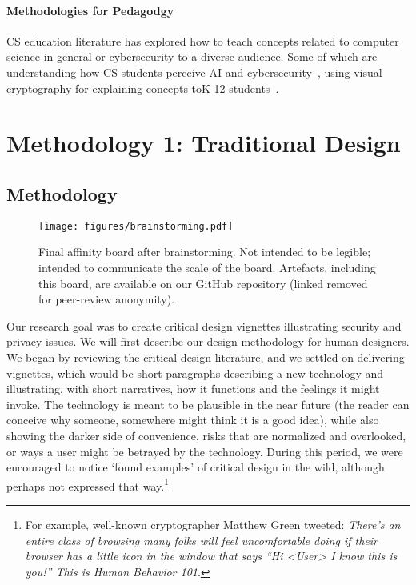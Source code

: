 \paragraph{Methodologies for Pedagodgy} 
CS education literature has explored how to teach concepts related to computer science in general or cybersecurity to a diverse audience. Some of which are understanding how CS students perceive AI and cybersecurity~\cite{ojha_computing_2023}, using visual cryptography for explaining concepts toK-12 students~\cite{rayavaram_designing_2023}.





\section{Methodology 1: Traditional Design}
\label{sec:meth1}

\subsection{Methodology}

\begin{figure}[t]
\begin{center}
\texttt{[image: figures/brainstorming.pdf]}
\caption{Final affinity board after brainstorming. Not intended to be legible; intended to communicate the scale of the board. Artefacts, including this board, are available on our GitHub repository (linked removed for peer-review anonymity).\label{fig:board}}
\end{center}
\end{figure}


Our research goal was to create critical design vignettes illustrating security and privacy issues. We will first describe our design methodology for human designers. We began by reviewing the critical design literature, and we settled on delivering vignettes, which would be short paragraphs describing a new technology and illustrating, with short narratives, how it functions and the feelings it might invoke. The technology is meant to be plausible in the near future (the reader can conceive why someone, somewhere might think it is a good idea), while also showing the darker side of convenience, risks that are normalized and overlooked, or ways a user might be betrayed by the technology. During this period, we were encouraged to notice `found examples' of critical design in the wild, although perhaps not expressed that way.\footnote{For example, well-known cryptographer Matthew Green tweeted: \textit{There’s an entire class of browsing many folks will feel uncomfortable doing if their browser has a little icon in the window that says “Hi <User> I know this is you!” This is Human Behavior 101}.}

